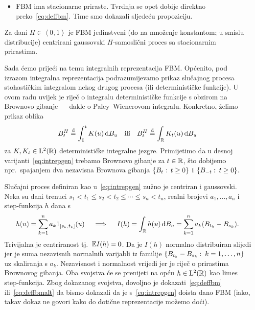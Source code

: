 \documentclass[main.tex]{subfiles}
\begin{document}
\begin{itemize}
	\item FBM ima stacionarne priraste. Tvrdnja se opet dobije direktno preko~\eqref{eq:deffbm}. Time smo dokazali sljedeću propoziciju.
\end{itemize}

\begin{propozicija}\label{prop:fbm}
	Za dani \( H \in \left\langle0,1\right\rangle \) je FBM jedinstveni (do na množenje konstantom; u smislu distribucije) centrirani gaussovski \( H \)-samoslični proces sa stacionarnim prirastima.
\end{propozicija}

Sada ćemo prijeći na temu integralnih reprezentacija FBM. Općenito, pod izrazom
integralna reprezentacija podrazumijevamo prikaz slučajnog procesa stohastičkim
integralom nekog drugog procesa (ili determinističke funkcije). U ovom radu
uvijek je riječ o integralu determinističke funkcije s obzirom na Brownovo gibanje --- dakle
o Paley--Wienerovom integralu. Konkretno, želimo prikaz oblika
\begin{equation}\label{eq:intrepgen}
	B^H_t \stackrel{\mathrm d}{=} \int_0^t K(u) \,\mathrm d B_u \quad \text{ili} \quad
	B^H_t \stackrel{\mathrm d}{=} \int_{\mathbb{R}} K_t(u) \,\mathrm d B_u
\end{equation}
za \( K, K_t \in \mathrm{L}^2(\mathbb{R}) \) determinističke integralne jezgre. Primijetimo da
u desnoj varijanti~\eqref{eq:intrepgen} trebamo Brownovo gibanje
za \( t \in \mathbb{R} \), što dobijemo npr.\ spajanjem dva nezavisna Brownova gibanja
\( \left\{ B_t \, \colon \, t \ge 0 \right\} \) i \( \left\{ B_{-t} \, \colon \, t \ge 0 \right\} \).

Slučajni proces definiran kao u~\eqref{eq:intrepgen} nužno je centriran
i gaussovski. Neka su dani trenuci \( s_1 < t_1 \le s_2 < t_2 \le \cdots \le s_n < t_n \),
realni brojevi \( a_1, \ldots, a_n \) i step-funkcija \( h \) dana s
\[
	h(u) = \sum_{k=1}^n a_k 1_{\left[ s_k, t_k \right]}(u) \quad
	\implies \quad
	I(h) = \int_{\mathbb{R}} h(u) \,\mathrm d B_u
	= \sum_{k=1}^n a_k(B_{t_k}-B_{s_k}).
\]
Trivijalna je centriranost tj.\ \( \mathbb{E} I(h) = 0 \). Da je
\( I(h) \) normalno distribuiran slijedi jer je suma nezavisnih
normalnih varijabli iz familije
\(
\left\{ B_{t_k} - B_{s_k} \, \colon \, k = 1, \ldots, n  \right\}
\)
uz skaliranja s \( a_k \). Nezavisnost i normalnost vrijedi
jer je riječ o prirastima Brownovog gibanja. Oba svojstva
će se prenijeti na opću \( h \in \mathrm{L}^2(\mathbb{R}) \) kao limes
step-funkcija. Zbog dokazanog svojstva, dovoljno je dokazati~\eqref{eq:deffbm}
ili~\eqref{eq:deffbmalt} da bismo dokazali da je s~\eqref{eq:intrepgen}
doista dano FBM (iako, takav dokaz ne govori kako do dotične reprezentacije možemo doći).
\end{document}
